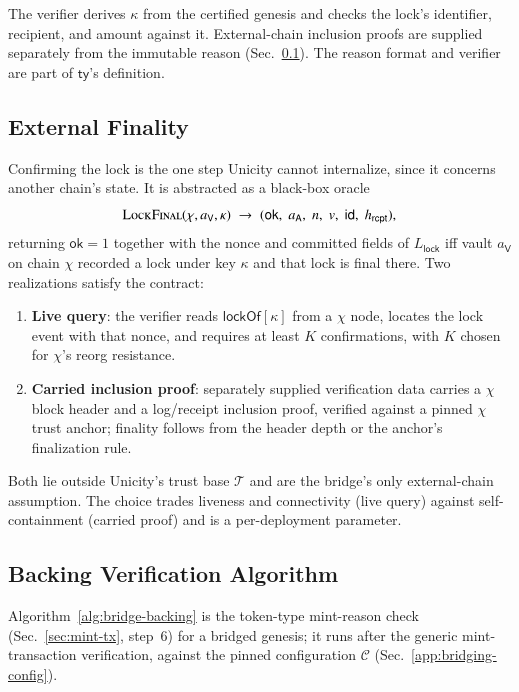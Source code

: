 The verifier derives $\kappa$ from the certified genesis and checks the lock's identifier, recipient, and amount against it. External-chain inclusion proofs are supplied separately from the immutable reason (Sec.~\ref{app:bridging-finality}). The reason format and verifier are part of $\mathsf{ty}$'s definition.

\subsection{External Finality}\label{app:bridging-finality}

Confirming the lock is the one step Unicity cannot internalize, since it concerns another chain's state. It is abstracted as a black-box oracle
\[
\Call{LockFinal}{\chi, a_\mathsf{V}, \kappa} \;\to\; (\mathsf{ok},\; a_\mathsf{A},\; n,\; v,\; \mathsf{id},\; h_\mathsf{rcpt}),
\]
returning $\mathsf{ok}=1$ together with the nonce and committed fields of $L_\mathsf{lock}$ iff vault $a_\mathsf{V}$ on chain $\chi$ recorded a lock under key $\kappa$ and that lock is final there. Two realizations satisfy the contract:
\begin{enumerate}
  \item \textbf{Live query}: the verifier reads $\mathsf{lockOf}[\kappa]$ from a $\chi$ node, locates the lock event with that nonce, and requires at least $K$ confirmations, with $K$ chosen for $\chi$'s reorg resistance.
  \item \textbf{Carried inclusion proof}: separately supplied verification data carries a $\chi$ block header and a log/receipt inclusion proof, verified against a pinned $\chi$ trust anchor; finality follows from the header depth or the anchor's finalization rule.
\end{enumerate}
Both lie outside Unicity's trust base $\mathcal{T}$ and are the bridge's only external-chain assumption. The choice trades liveness and connectivity (live query) against self-containment (carried proof) and is a per-deployment parameter.

\subsection{Backing Verification Algorithm}\label{app:bridging-backing}

Algorithm~\ref{alg:bridge-backing} is the token-type mint-reason check (Sec.~\ref{sec:mint-tx}, step~6) for a bridged genesis; it runs after the generic mint-transaction verification, against the pinned configuration $\mathcal{C}$ (Sec.~\ref{app:bridging-config}).

